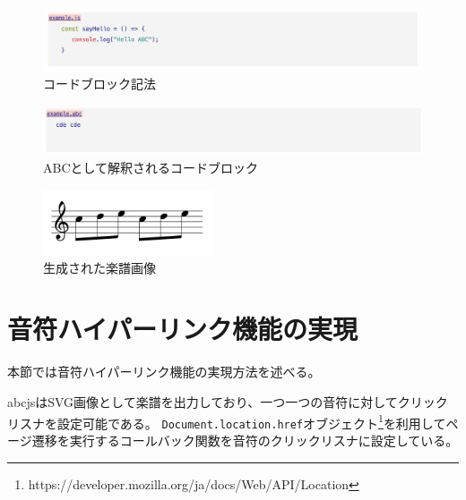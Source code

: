 \begin{figure}[H]
    \centering
    \includegraphics[width=15cm]{images/codeblock.png}
    \caption{コードブロック記法}
    \label{codeblock}
\end{figure}

\begin{figure}[H]
    \centering
    \includegraphics[width=15cm]{images/abcblock.png}
    \caption{ABCとして解釈されるコードブロック}
    \label{abcblock}
\end{figure}

\begin{figure}[H]
    \centering
    \includegraphics[width=5cm]{images/cdecde.png}
    \caption{生成された楽譜画像}
    \label{cde}
\end{figure}

\section{音符ハイパーリンク機能の実現}
本節では音符ハイパーリンク機能の実現方法を述べる。

abcjsはSVG画像として楽譜を出力しており、一つ一つの音符に対してクリックリスナを設定可能である。
\texttt{Document.location.href}オブジェクト\footnote{\textsf{https://developer.mozilla.org/ja/docs/Web/API/Location}}を利用してページ遷移を実行するコールバック関数を音符のクリックリスナに設定している。
